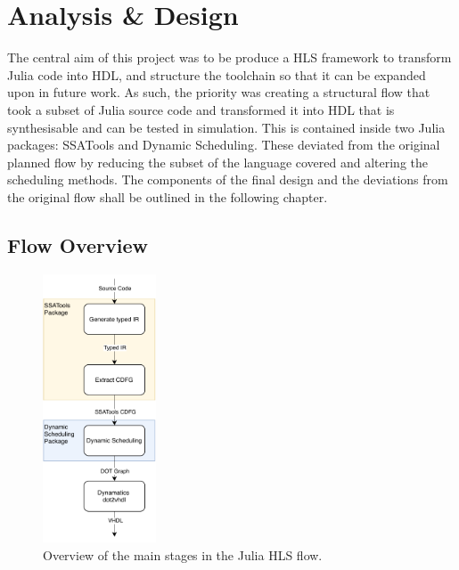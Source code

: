\chapter{Analysis \& Design}
The central aim of this project was to be produce a HLS framework to transform Julia code into HDL, and structure the toolchain so that it can be expanded upon in future work. As such, the priority was creating a structural flow that took a subset of Julia source code and transformed it into HDL that is synthesisable and can be tested in simulation. This is contained inside two Julia packages: SSATools and Dynamic Scheduling. These deviated from the original planned flow by reducing the subset of the language covered and altering the scheduling methods. The components of the final design and the deviations from the original flow shall be outlined in the following chapter.

\section{Flow Overview}
\begin{figure}[htb!]
    \centering
    \includegraphics[width=0.3\textwidth]{Images/basic_flow.pdf}
    \caption{Overview of the main stages in the Julia HLS flow.}
    \label{fig:julia_flow_overview}
\end{figure}

